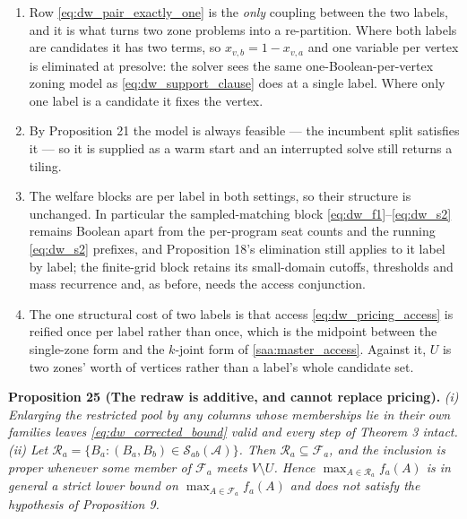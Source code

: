 \documentclass{article}
\begin{document}
\begin{enumerate}
\item Row \eqref{eq:dw_pair_exactly_one} is the \emph{only} coupling between the
two labels, and it is what turns two zone problems into a re-partition. Where
both labels are candidates it has two terms, so $x_{v,b} = 1 - x_{v,a}$ and one
variable per vertex is eliminated at presolve: the solver sees the same
one-Boolean-per-vertex zoning model as \eqref{eq:dw_support_clause} does at a
single label. Where only one label is a candidate it fixes the vertex.
\item By Proposition 21 the model is always feasible --- the incumbent split
satisfies it --- so it is supplied as a warm start and an interrupted solve
still returns a tiling.
\item The welfare blocks are per label in both settings, so their structure is
unchanged. In particular the sampled-matching block
\eqref{eq:dw_f1}--\eqref{eq:dw_s2} remains Boolean apart from the per-program
seat counts and the running \eqref{eq:dw_s2} prefixes, and Proposition 18's
elimination still applies to it label by label; the finite-grid block retains
its small-domain cutoffs, thresholds and mass recurrence and, as before, needs
the access conjunction.
\item The one structural cost of two labels is that access
\eqref{eq:dw_pricing_access} is reified once per label rather than once, which
is the midpoint between the single-zone form and the $k$-joint form of
\eqref{saa:master_access}. Against it, $U$ is two zones' worth of vertices
rather than a label's whole candidate set.
\end{enumerate}

\noindent\textbf{Proposition 25 (The redraw is additive, and cannot replace
pricing).} \textit{(i) Enlarging the restricted pool by any columns whose
memberships lie in their own families leaves \eqref{eq:dw_corrected_bound} valid
and every step of Theorem 3 intact. (ii) Let
$\mathcal R_a = \{B_a : (B_a, B_b) \in \mathcal S_{ab}(\mathcal A)\}$. Then
$\mathcal R_a \subseteq \mathcal F_a$, and the inclusion is proper whenever some
member of $\mathcal F_a$ meets $V \setminus U$. Hence
$\max_{A \in \mathcal R_a} f_a(A)$ is in general a strict \emph{lower} bound on
$\max_{A \in \mathcal F_a} f_a(A)$ and does not satisfy the hypothesis of
Proposition 9.}
\end{document}
